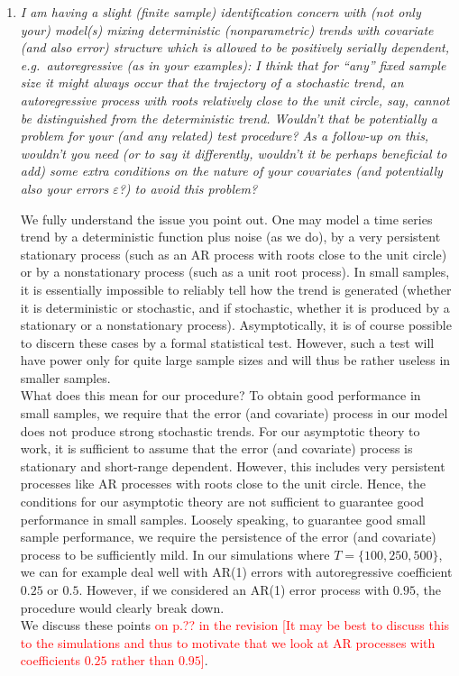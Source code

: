 \documentclass[a4paper,12pt]{article}
\begin{document}
\begin{enumerate}[label=\arabic*.,leftmargin=0.6cm]
\item \textit{I am having a slight (finite sample) identification concern with (not only your) model(s) mixing deterministic (nonparametric) trends with covariate (and also error) structure which is allowed to be positively serially dependent, e.g.\ autoregressive (as in your examples): I think that for ``any'' fixed sample size it might always occur that the trajectory of a stochastic trend, an autoregressive process with roots relatively close to the unit circle, say, cannot be distinguished from the deterministic trend. Wouldn't that be potentially a problem for your (and any related) test procedure? As a follow-up on this, wouldn't you need (or to say it differently, wouldn't it be perhaps beneficial to add) some extra conditions on the nature of your covariates (and potentially also your errors $\varepsilon$?) to avoid this problem?}

We fully understand the issue you point out. One may model a time series trend by a deterministic function plus noise (as we do), by a very persistent stationary process (such as an AR process with roots close to the unit circle) or by a nonstationary process (such as a unit root process). In small samples, it is essentially impossible to reliably tell how the trend is generated (whether it is deterministic or stochastic, and if stochastic, whether it is produced by a stationary or a nonstationary process). Asymptotically, it is of course possible to discern these cases by a formal statistical test. However, such a test will have power only for quite large sample sizes and will thus be rather useless in smaller samples. \\
What does this mean for our procedure? To obtain good performance in small samples, we require that the error (and covariate) process in our model does not produce strong stochastic trends. For our asymptotic theory to work, it is sufficient to assume that the error (and covariate) process is stationary and short-range dependent. However, this includes very persistent processes like AR processes with roots close to the unit circle. Hence, the conditions for our asymptotic theory are not sufficient to guarantee good performance in small samples. Loosely speaking, to guarantee good small sample performance, we require the persistence of the error (and covariate) process to be sufficiently mild. In our simulations where $T=\{100,250,500\}$, we can for example deal well with AR(1) errors with autoregressive coefficient $0.25$ or $0.5$. However, if we considered an AR(1) error process with $0.95$, the procedure would clearly break down. \\
We discuss these points \textcolor{red}{on p.?? in the revision [It may be best to discuss this to the simulations and thus to motivate that we look at AR processes with coefficients $0.25$ rather than $0.95$]}.


\end{enumerate}
\end{document}
